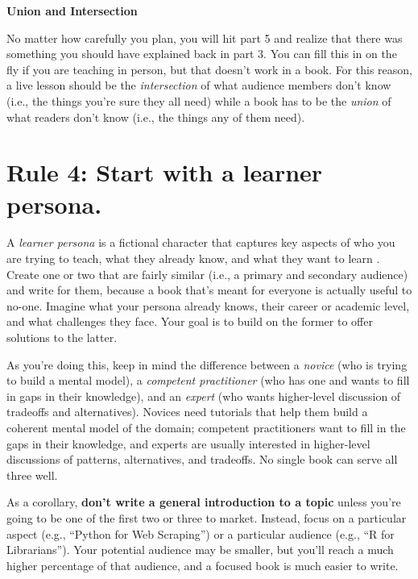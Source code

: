 \documentclass[10pt,letterpaper]{article}
\begin{document}
\begin{mdframed}
\textbf{Union and Intersection}

\noindent
No matter how carefully you plan, you will hit part 5 and realize that
there was something you should have explained back in part 3. You can
fill this in on the fly if you are teaching in person, but that doesn't
work in a book. For this reason, a live lesson should be the
\emph{intersection} of what audience members don't know (i.e., the
things you're sure they all need) while a book has to be the
\emph{union} of what readers don't know (i.e., the things any of them
need).
\end{mdframed}

\section*{Rule 4: Start with a learner persona.}

A \emph{learner persona} is a fictional character that captures key
aspects of who you are trying to teach, what they already know, and what
they want to learn \cite{Wi2019}. Create one or two that are fairly
similar (i.e., a primary and secondary audience) and write for them,
because a book that's meant for everyone is actually useful to no-one.
Imagine what your persona already knows, their career or academic level,
and what challenges they face. Your goal is to build on the former to
offer solutions to the latter.

As you're doing this, keep in mind the difference between a
\emph{novice} (who is trying to build a mental model), a \emph{competent
practitioner} (who has one and wants to fill in gaps in their
knowledge), and an \emph{expert} (who wants higher-level discussion of
tradeoffs and alternatives). Novices need tutorials that help them build
a coherent mental model of the domain; competent practitioners want to
fill in the gaps in their knowledge, and experts are usually interested
in higher-level discussions of patterns, alternatives, and tradeoffs. No
single book can serve all three well.

As a corollary, \textbf{don't write a general introduction to a topic}
unless you're going to be one of the first two or three to market.
Instead, focus on a particular aspect (e.g., ``Python for Web
Scraping'') or a particular audience (e.g., ``R for Librarians''). Your
potential audience may be smaller, but you'll reach a much higher
percentage of that audience, and a focused book is much easier to write.
\end{document}

